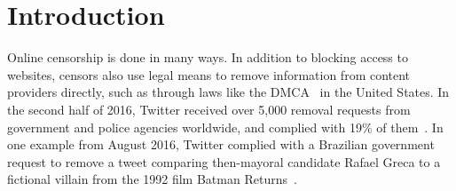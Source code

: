 




\section{Introduction}

Online censorship is done in many ways. In addition to blocking access to
websites, censors also use legal means to remove information from content
providers directly, such as through laws like the DMCA~\cite{dmca} in the United States.
In the second half of 2016, Twitter received
over 5,000 removal requests from government and police agencies worldwide, and
complied with 19\% of them~\cite{twitter-transparency}. In one example from August 2016, Twitter complied with
a Brazilian government request to remove a tweet comparing then-mayoral
candidate Rafael Greca to a fictional villain from the 1992 film Batman
Returns~\cite{twitter-rafael-greca}.

